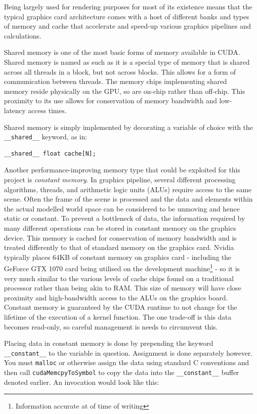 \documentclass[conference]{IEEEtran}
\begin{document}
Being largely used for rendering purposes for most of its existence means that the typical graphics card architecture comes with a host of different banks and types of memory and cache that accelerate and speed-up various graphics pipelines and calculations.

Shared memory is one of the most basic forms of memory available in CUDA. Shared memory is named as such as it is a special type of memory that is shared across all threads in a block, but not across blocks. This allows for a form of communication between threads. The memory chips implementing shared memory reside physically on the GPU, so are on-chip rather than off-chip. This proximity to its use allows for conservation of memory bandwidth and low-latency access times.

Shared memory is simply implemented by decorating a variable of choice with the \texttt{\_\_shared\_\_} keyword, as in:

\begin{lstlisting}[breaklines]
__shared__ float cache[N];
\end{lstlisting}

Another performance-improving memory type that could be exploited for this project is \textit{constant memory}. In graphics pipeline, several different processing algorithms, threads, and arithmetic logic units (ALUs) require access to the same scene. Often the frame of the scene is processed and the data and elements within the actual modelled world space can be considered to be unmoving and hence static or constant. To prevent a bottleneck of data, the information required by many different operations can be stored in constant memory on the graphics device. This memory is cached for conservation of memory bandwidth and is treated differently to that of standard memory on the graphics card. Nvidia typically places 64KB of constant memory on graphics card - including the GeForce GTX 1070 card being utilised on the development machine\footnote{Information accurate at of time of writing} - so it is very much similar to the various levels of cache chips found on a traditional processor rather than being akin to RAM. This size of memory will have close proximity and high-bandwidth access to the ALUs on the graphics board. Constant memory is guaranteed by the CUDA runtime to not change for the lifetime of the execution of a kernel function. The one trade-off is this data becomes read-only, so careful management is needs to circumvent this.

Placing data in constant memory is done by prepending the keyword \texttt{\_\_constant\_\_} to the variable in question. Assignment is done separately however. You must \texttt{malloc} or otherwise assign the data using standard C conventions and then call \texttt{cudaMemcpyToSymbol} to copy the data into the \texttt{\_\_constant\_\_} buffer denoted earlier. An invocation would look like this:
\end{document}
